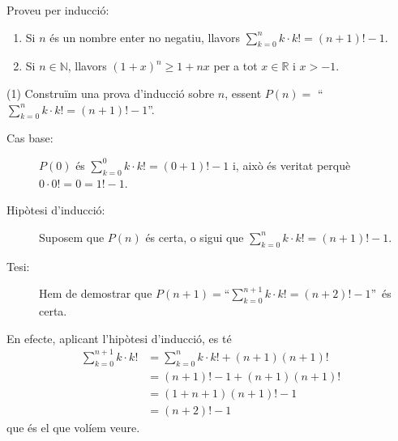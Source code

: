 \begin{exercici}
Proveu per inducció:

\begin{enumerate}
\item Si $n$ és un nombre enter no negatiu, llavors $%
{\displaystyle\sum\limits_{k=0}^{n}}
k\cdot k!=\left(  n+1\right)  !-1$.

\item Si $n\in\mathbb{N}$, llavors $\left(  1+x\right)  ^{n}\geq1+nx$ per a
tot $x\in\mathbb{R}$ i $x>-1$.
\end{enumerate}
\end{exercici}

\begin{solucio}
(1) Construïm una prova d'inducció sobre $n$, essent $P(n)=$
\enquote{$%
{\displaystyle\sum\limits_{k=0}^{n}}
k\cdot k!=\left(  n+1\right)  !-1$}.

\begin{description}
\item[Cas base:] $P(0)$ és $%
{\displaystyle\sum\limits_{k=0}^{0}}
k\cdot k!=\left(  0+1\right)  !-1$ i, això és veritat perquè
$0\cdot0!=0=1!-1$.

\item[Hipòtesi d'inducció:] Suposem que $P(n)$ és certa, o sigui
que $%
{\displaystyle\sum\limits_{k=0}^{n}}
k\cdot k!=\left(  n+1\right)  !-1$.

\item[Tesi:] Hem de demostrar que $P(n+1)=$\enquote{$%
{\displaystyle\sum\limits_{k=0}^{n+1}}
k\cdot k!=\left(  n+2\right)  !-1$}\ és certa.
\end{description}

En efecte, aplicant l'hipòtesi d'inducció, es té%
\begin{align*}%
{\displaystyle\sum\limits_{k=0}^{n+1}}
k\cdot k!  &  =%
{\displaystyle\sum\limits_{k=0}^{n}}
k\cdot k!+(n+1)(n+1)!\\
&  =\left(  n+1\right)  !-1+(n+1)(n+1)!\\
&  =(1+n+1)(n+1)!-1\\
&  =(n+2)!-1
\end{align*}
que és el que volíem veure.


\end{solucio}
